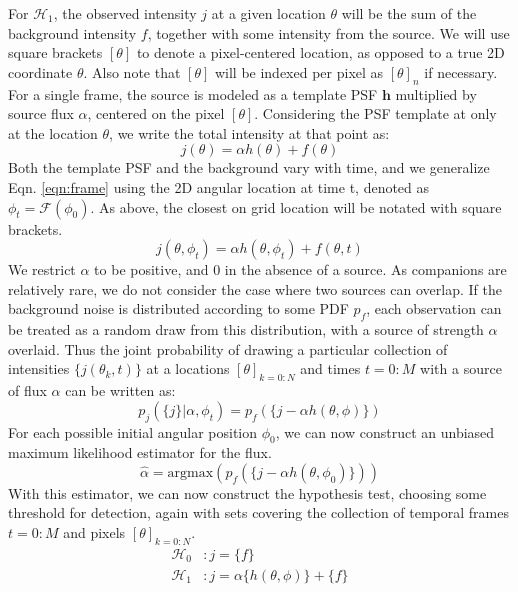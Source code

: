 \documentclass[twocolumn,fleqn]{aastex62}
\begin{document}
For $\mathcal{H}_{1}$, the observed intensity $j$ at a given location $\theta$ will be the sum of the background intensity $f$, together with some intensity from the source. 
We will use square brackets $[\theta]$ to denote a pixel-centered location, as opposed to a true 2D coordinate $\theta$.
Also note that $[\theta]$ will be indexed per pixel as $[\theta]_{n}$ if necessary.
For a single frame, the source is modeled as a template PSF $\textbf{h}$ multiplied by source flux $\alpha$, centered on the pixel $[\theta]$. Considering the PSF template at only at the location $\theta$, we write the total intensity at that point as:
\begin{equation}\label{eqn:frame}
j(\theta) = \alpha h(\theta) + f(\theta)
\end{equation}
Both the template PSF and the background vary with time, and we generalize Eqn. \ref{eqn:frame} using the 2D angular location at time t, denoted as $\phi_{t} = \mathcal{F}(\phi_{0})$. 
As above, the closest on grid location will be notated with square brackets.
\begin{equation}
j(\theta,\phi_{t}) = \alpha h(\theta,\phi_{t}) + f(\theta,t)
\end{equation}
We restrict $\alpha$ to be positive, and 0 in the absence of a source.
As companions are relatively rare, we do not consider the case where two sources can overlap.
If the background noise is distributed according to some PDF $p_{f}$, each observation can be treated as a random draw from this distribution, with a source of strength $\alpha$ overlaid. 
Thus the joint probability of drawing a particular collection of intensities $\{j(\theta_{k},t)\}$ at a locations $[\theta]_{k=0:N}$ and times $t=0:M$ with a source of flux $\alpha$ can be written as:
\begin{equation}
p_{j}(\{j\}|\alpha,\phi_{t}) = p_{f}(\{j - \alpha h(\theta,\phi)\})
\end{equation}  
For each possible initial angular position $\phi_{0}$, we can now construct an unbiased maximum likelihood estimator for the flux. 
\begin{equation}
\hat{\alpha} = \textrm{argmax}\left(p_{f}(\{j - \alpha h(\theta,\phi_{0})\})\right)
\end{equation}
With this estimator, we can now construct the hypothesis test, choosing some threshold for detection, again with sets covering the collection of temporal frames $t=0:M$ and pixels $[\theta]_{k=0:N}$.
\begin{align}
\mathcal{H}_{0} &: {j} = \{f\}\\
\mathcal{H}_{1} &: {j} = \alpha \{h(\theta,\phi)\} + \{f\}
\end{align}
\end{document}
